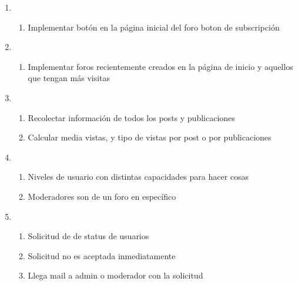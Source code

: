 \documentclass[12pt, letterpaper, notitlepage]{article}
\begin{document}
\begin{enumerate}
		
		\item {}
		\begin{enumerate}
			\item Implementar botón en la página inicial del foro boton de subscripción
		\end{enumerate}
		
		
		\item {}
		\begin{enumerate}
			\item Implementar foros recientemente creados en la página de inicio y aquellos que tengan más visitas
		\end{enumerate}
		
		
		
		\item {}
		\begin{enumerate}
			\item Recolectar información de todos los posts y publicaciones
			\item Calcular media vistas, y tipo de vistas por post o por publicaciones
		\end{enumerate}
		
		\item {}
		\begin{enumerate}
			\item Niveles de usuario con distintas capacidades para hacer cosas
			\item Moderadores son de un foro en específico
		\end{enumerate}
		
		\item {}
		\begin{enumerate}
			\item Solicitud de  de status de usuarios
			\item Solicitud no es aceptada inmediatamente
			\item Llega mail a admin o moderador con la solicitud
		\end{enumerate}
		

\end{enumerate}
\end{document}
